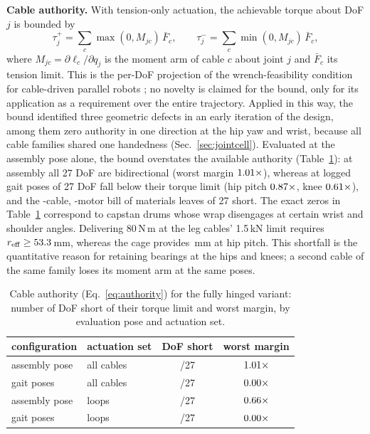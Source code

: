 \documentclass[letterpaper, 10pt, conference]{ieeeconf}
\newcommand{\Fmax}{\bar{F}}
\begin{document}
\textbf{Cable authority.} With tension-only actuation, the achievable
torque about DoF $j$ is bounded by
\begin{equation}
  \tau_j^{+} = \sum_c \max(0, M_{jc})\,\Fmax_c,\qquad
  \tau_j^{-} = \sum_c \min(0, M_{jc})\,\Fmax_c,
  \label{eq:authority}
\end{equation}
where $M_{jc}=\partial\ell_c/\partial q_j$ is the moment arm of cable $c$
about joint $j$ and $\Fmax_c$ its tension limit. This is the per-DoF
projection of the wrench-feasibility condition for cable-driven parallel
robots \cite{bosscher2004wrench,gouttefarde2007wfw}; no novelty is claimed
for the bound, only for its application as a requirement over the entire
trajectory. Applied in this way, the bound identified three geometric defects in an
early iteration of the design, among them zero authority in one direction
at the hip yaw and wrist, because all cable families shared one handedness
(Sec.~\ref{sec:jointcell}). Evaluated at the assembly pose alone, the bound
overstates the available authority (Table~\ref{tab:authority}):
at assembly all 27 DoF are bidirectional (worst margin
$1.01\times$), whereas at logged gait poses \authShortGaitAll{} of
27 DoF fall below their torque limit (hip pitch $0.87\times$, knee
$0.61\times$), and the \numDrivenCables{}-cable,
\numMotors-motor bill of materials leaves \authShortGaitBom{} of 27 short.
The exact zeros in Table~\ref{tab:authority} correspond to capstan drums
whose wrap disengages at certain wrist and shoulder angles. Delivering
80\,N\,m at the leg cables' 1.5\,kN limit requires
$r_{\mathrm{eff}}\ge53.3$\,mm, whereas the cage provides
\rHaveHip\,mm at hip pitch. This shortfall is the quantitative reason for
retaining bearings at the hips and knees; a second cable of the same
family loses its moment arm at the same poses.

\begin{table}[tb]
\centering
\caption{Cable authority (Eq.~\ref{eq:authority}) for the fully hinged
variant: number of DoF short of their torque limit and worst margin, by
evaluation pose and actuation set.}
\label{tab:authority}
\footnotesize
\begin{tabular}{llcc}
\toprule
configuration & actuation set & DoF short & worst margin\\
\midrule
assembly pose & all cables & \authShortHomeAll{}/27 & $1.01\times$\\
gait poses    & all cables & \authShortGaitAll{}/27 & $0.00\times$\\
assembly pose & \numMotors{} loops & \authShortHomeBom{}/27 & $0.66\times$\\
gait poses    & \numMotors{} loops & \authShortGaitBom{}/27 & $0.00\times$\\
\bottomrule
\end{tabular}
\end{table}
\end{document}
